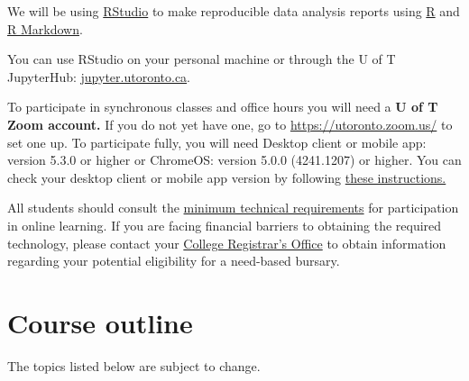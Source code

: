 \documentclass[
  openany]{book}
\begin{document}
We will be using \href{https://www.rstudio.com/}{RStudio} to make reproducible data analysis reports using \href{https://www.r-project.org/}{R} and \href{http://rmarkdown.rstudio.com/}{R Markdown}.

You can use RStudio on your personal machine or through the U of T JupyterHub: \href{https://jupyter.utoronto.ca/}{jupyter.utoronto.ca}.

To participate in synchronous classes and office hours you will need a \textbf{U of T Zoom account.} If you do not yet have one, go to \url{https://utoronto.zoom.us/} to set one up. To participate fully, you will need Desktop client or mobile app: version 5.3.0 or higher or ChromeOS: version 5.0.0 (4241.1207) or higher. You can check your desktop client or mobile app version by following \href{https://support.zoom.us/hc/en-us/articles/201362393-Viewing-the-Zoom-version-number}{these instructions.}

All students should consult the \href{https://www.viceprovoststudents.utoronto.ca/covid-19/tech-requirements-online-learning/}{minimum technical requirements} for participation in online learning. If you are facing financial barriers to obtaining the required technology, please contact your \href{https://www.artsci.utoronto.ca/current/academic-advising-and-support/college-registrars-offices}{College Registrar's Office} to obtain information regarding your potential eligibility for a need-based bursary.

\hypertarget{course-outline}{%
\section{Course outline}\label{course-outline}}

The topics listed below are subject to change.
\end{document}
